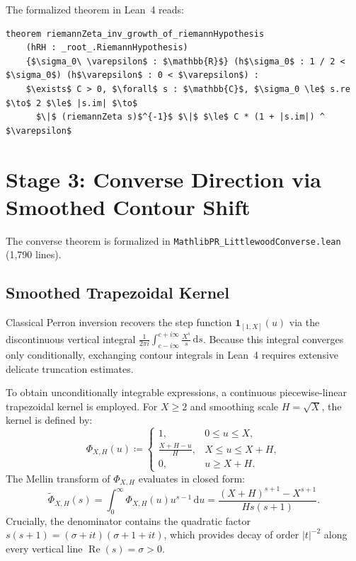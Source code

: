 \documentclass[11pt,a4paper]{article}
\theoremstyle{definition}
\newcommand{\dee}{\mathrm{d}}
\begin{document}
The formalized theorem in Lean~4 reads:
\begin{lstlisting}
theorem riemannZeta_inv_growth_of_riemannHypothesis
    (hRH : _root_.RiemannHypothesis)
    {$\sigma_0\ \varepsilon$ : $\mathbb{R}$} (h$\sigma_0$ : 1 / 2 < $\sigma_0$) (h$\varepsilon$ : 0 < $\varepsilon$) :
    $\exists$ C > 0, $\forall$ s : $\mathbb{C}$, $\sigma_0 \le$ s.re $\to$ 2 $\le$ |s.im| $\to$
      $\|$ (riemannZeta s)$^{-1}$ $\|$ $\le$ C * (1 + |s.im|) ^ $\varepsilon$
\end{lstlisting}

\section{Stage 3: Converse Direction via Smoothed Contour Shift}
\label{sec:converse}

The converse theorem is formalized in \texttt{MathlibPR\_LittlewoodConverse.lean} (1,790 lines).

\subsection{Smoothed Trapezoidal Kernel}
Classical Perron inversion recovers the step function $\mathbf{1}_{[1, X]}(u)$ via the discontinuous vertical integral $\frac{1}{2\pi i} \int_{c - i\infty}^{c + i\infty} \frac{X^s}{s}\,\dee s$. Because this integral converges only conditionally, exchanging contour integrals in Lean~4 requires extensive delicate truncation estimates.

To obtain unconditionally integrable expressions, a continuous piecewise-linear trapezoidal kernel is employed. For $X \ge 2$ and smoothing scale $H = \sqrt{X}$, the kernel is defined by:
\begin{equation}
\label{eq:trapezoid_kernel}
\Phi_{X,H}(u) \coloneqq \begin{cases}
1, & 0 \le u \le X, \\
\frac{X+H-u}{H}, & X \le u \le X+H, \\
0, & u \ge X+H.
\end{cases}
\end{equation}
The Mellin transform of $\Phi_{X,H}$ evaluates in closed form:
\begin{equation}
\label{eq:mellin_phi}
\widetilde{\Phi}_{X,H}(s) = \int_0^\infty \Phi_{X,H}(u) u^{s-1}\,\dee u = \frac{(X+H)^{s+1} - X^{s+1}}{H s (s+1)}.
\end{equation}
Crucially, the denominator contains the quadratic factor $s(s+1) = (\sigma + it)(\sigma + 1 + it)$, which provides decay of order $|t|^{-2}$ along every vertical line $\operatorname{Re}(s) = \sigma > 0$.
\end{document}
